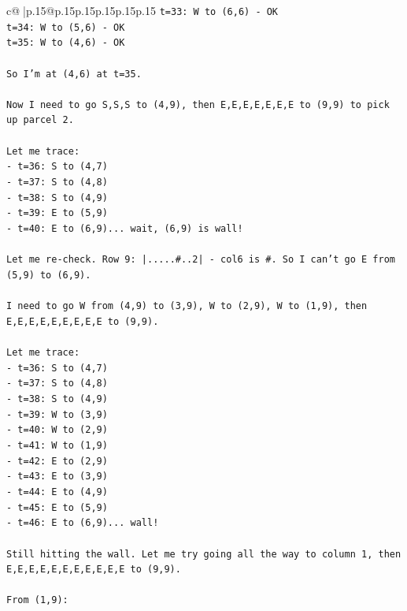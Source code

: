\documentclass{article}
\begin{document}
{\begin{supertabular}{c@{$\;$}|p{.15\linewidth}@{}p{.15\linewidth}p{.15\linewidth}p{.15\linewidth}p{.15\linewidth}p{.15\linewidth}}
{{{\texttt{t=33: W to (6,6) {-} OK} \\
\texttt{t=34: W to (5,6) {-} OK} \\
\texttt{t=35: W to (4,6) {-} OK} \\
\\ 
\texttt{So I'm at (4,6) at t=35.} \\
\\ 
\texttt{Now I need to go S,S,S to (4,9), then E,E,E,E,E,E,E to (9,9) to pick up parcel 2.} \\
\\ 
\texttt{Let me trace:} \\
\texttt{{-} t=36: S to (4,7)} \\
\texttt{{-} t=37: S to (4,8)} \\
\texttt{{-} t=38: S to (4,9)} \\
\texttt{{-} t=39: E to (5,9)} \\
\texttt{{-} t=40: E to (6,9)... wait, (6,9) is wall!} \\
\\ 
\texttt{Let me re{-}check. Row 9: |.....\#..2| {-} col6 is \#. So I can't go E from (5,9) to (6,9).} \\
\\ 
\texttt{I need to go W from (4,9) to (3,9), W to (2,9), W to (1,9), then E,E,E,E,E,E,E,E,E to (9,9).} \\
\\ 
\texttt{Let me trace:} \\
\texttt{{-} t=36: S to (4,7)} \\
\texttt{{-} t=37: S to (4,8)} \\
\texttt{{-} t=38: S to (4,9)} \\
\texttt{{-} t=39: W to (3,9)} \\
\texttt{{-} t=40: W to (2,9)} \\
\texttt{{-} t=41: W to (1,9)} \\
\texttt{{-} t=42: E to (2,9)} \\
\texttt{{-} t=43: E to (3,9)} \\
\texttt{{-} t=44: E to (4,9)} \\
\texttt{{-} t=45: E to (5,9)} \\
\texttt{{-} t=46: E to (6,9)... wall!} \\
\\ 
\texttt{Still hitting the wall. Let me try going all the way to column 1, then E,E,E,E,E,E,E,E,E,E,E to (9,9).} \\
\\ 
\texttt{From (1,9):} \\
}}}
\end{supertabular}}
\end{document}
